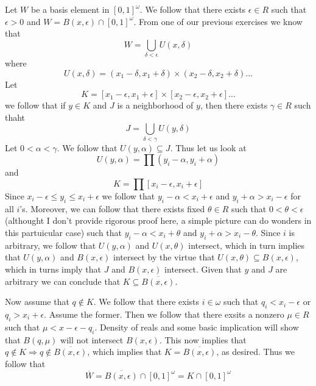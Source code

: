 \documentclass[11pt,oneside,titlepage]{book}
\DeclareMathOperator \ra {\Rightarrow}
\begin{document}
Let $W$ be a basis element in $[0, 1]^\omega$. We follow that there exists $\epsilon \in R$
such that $\epsilon > 0$ and $W = B(x, \epsilon) \cap [0, 1]^\omega$. From one of our
previous exercises we know that
$$W = \bigcup_{\delta < \epsilon}{U(x, \delta)}$$
where
$$U(x, \delta) = (x_1 - \delta, x_1 + \delta) \times (x_2 - \delta, x_2 + \delta) ...$$
Let
$$K = [x_1 - \epsilon, x_1 + \epsilon] \times [x_2 - \epsilon, x_2 + \epsilon] ...$$
we follow that if $y \in K$ and $J$ is a neighborhood of $y$, then there exists $\gamma \in R$
such thaht
$$J = \bigcup_{\delta < \gamma}{U(y, \delta)}$$
Let $0 < \alpha < \gamma$. We follow that $U(y, \alpha) \subseteq J$. Thus let us look at
$$U(y, \alpha) = \prod{(y_i - \alpha, y_i + \alpha)}$$
and
$$K = \prod{[x_i - \epsilon, x_i + \epsilon]}$$
Since $x_i - \epsilon \leq y_i \leq x_i + \epsilon$  we follow that $y_i - \alpha < x_i + \epsilon$
and $y_i + \alpha > x_i - \epsilon$ for all $i$'s. Moreover, we can follow that there
exists fixed $\theta \in R$ such that $0 < \theta < \epsilon$ (althought I don't provide
rigorous proof here, a simple picture can do wonders in this partuicular case) such that
$y_i - \alpha < x_i + \theta$ and $y_i + \alpha > x_i - \theta$. Since $i$ is arbitrary,
we follow that $U(y, \alpha)$ and $U(x, \theta)$ intersect, which in turn implies that
$U(y, \alpha)$ and $B(x, \epsilon)$ intersect by the virtue that
$U(x, \theta) \subseteq B(x, \epsilon)$, which in turns imply that $J$ and $B(x, \epsilon)$
intersect. Given that $y$ and $J$ are arbitrary we can conclude that
$K \subseteq \overline{B(x, \epsilon)}$.

Now assume that $q \notin K$. We follow that there exists $i \in \omega$ such that
$q_i < x_i - \epsilon$ or $q_i > x_i + \epsilon$. Assume the former. Then we follow that
there exsits a nonzero $\mu \in R$ such that $\mu < x - \epsilon - q_i$. Density of reals
and some basic implication will show that $B(q, \mu)$ will not intersect $B(x, \epsilon)$.
This now implies that $q \notin K \ra q \notin \overline{B(x, \epsilon)}$, which implies that
$K = \overline{B(x, \epsilon)}$, as desired. Thus we follow that
$$\overline{W} = \overline{B(x, \epsilon)} \cap [0, 1]^\omega = K \cap [0, 1]^\omega$$
\end{document}
